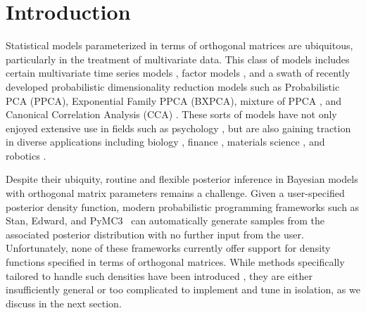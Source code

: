 \documentclass[ba]{imsart}
\numberwithin{equation}{section}
\theoremstyle{plain}
\begin{document}
\section{Introduction}
Statistical models parameterized in terms of orthogonal matrices are ubiquitous, particularly in the treatment of multivariate data. This class of models includes certain multivariate time series models \citep{brockwell2002introduction}, factor models \citep{johnson2004multivariate}, and a swath of recently developed probabilistic dimensionality reduction models such as Probabilistic PCA (PPCA),  Exponential Family PPCA (BXPCA), mixture of PPCA \citep{ghahramani1996algorithm}, and Canonical Correlation Analysis (CCA) \citep[Chapt.~12.5]{murphy2012machine}. These sorts of models have not only enjoyed extensive use in fields such as psychology \citep{ford1986application}, but are also gaining traction in diverse applications including biology \citep{hamelryck2006sampling}, finance \citep{lee2007bayesian}, materials science \citep{oh20172d}, and robotics \citep{lu1997robot}.

\noindent Despite their ubiquity, routine and flexible posterior inference in Bayesian models with orthogonal matrix parameters remains a challenge. Given a user-specified posterior density function, modern probabilistic programming frameworks such as Stan, Edward, and PyMC3~\citep{carpenter2016stan,tran2016edward,salvatier2016probabilistic} can automatically generate samples from the associated posterior distribution with no further input from the user. Unfortunately, none of these frameworks currently offer support for density functions specified in terms of orthogonal matrices. While methods specifically tailored to handle such densities have been introduced \citep{hoff2009simulation,brubaker2012family,byrne2013geodesic}, they are either insufficiently general or too complicated to implement and tune in isolation, as we discuss in the next section.
\end{document}
